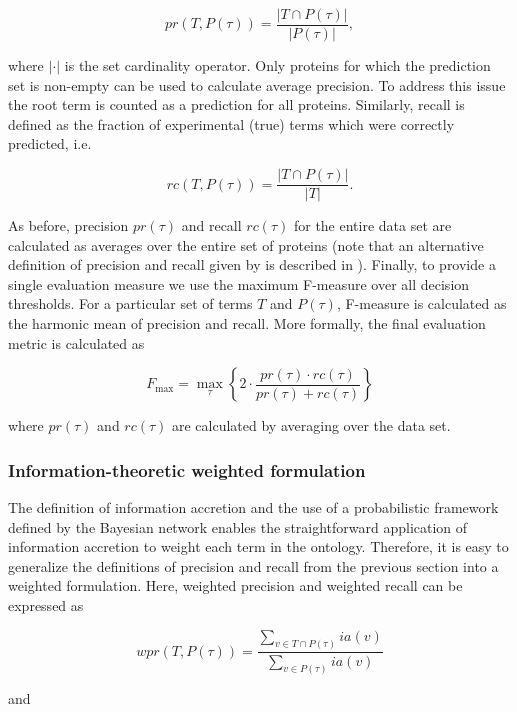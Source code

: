 \[
pr(T,P(\tau))=\frac{|T\cap P(\tau)|}{|P(\tau)|},
\]

\noindent where $\left|\cdot\right|$ is the set cardinality operator.  Only proteins for which the prediction set is non-empty can be used to calculate average precision.  To address this issue the root term is counted as a prediction for all proteins. Similarly, recall is defined as the fraction of experimental (true) terms which were correctly predicted, i.e.

\[
rc(T,P(\tau))=\frac{|T\cap P(\tau)|}{|T|}.
\]


\noindent As before, precision $pr(\tau)$ and recall $rc(\tau)$ for the entire data set are calculated as averages over the entire set of proteins (note that an alternative definition of precision and recall given by \citealt{Verspoor2006} is described in ). Finally, to provide a single evaluation measure we use the maximum F-measure over all decision thresholds. For a particular set of terms $T$ and $P(\tau)$, F-measure is calculated as the harmonic mean of precision and recall. More formally, the final evaluation metric is calculated as

\begin{equation}
F_{\max}=\underset{\tau}{\max}\left\{ 2\cdot\frac{pr(\tau)\cdot rc(\tau)}{pr(\tau)+rc(\tau)}\right\} 
\label{eq:fmax}
\end{equation}


\noindent where $pr(\tau)$ and $rc(\tau)$ are calculated by averaging over the data set. 

\subsubsection{Information-theoretic weighted formulation}

The definition of information accretion and the use of a probabilistic framework defined by the Bayesian network enables the straightforward application of information accretion to weight each term in the ontology. Therefore, it is easy to generalize the definitions of precision and recall from the previous section into a weighted formulation. Here, weighted precision and weighted recall can be expressed as

\[
wpr(T,P(\tau))=\frac{\underset{v\in T\cap P(\tau)}{\sum}ia(v)}{\underset{v\in P(\tau)}{\sum}ia(v)}
\]


\noindent and


